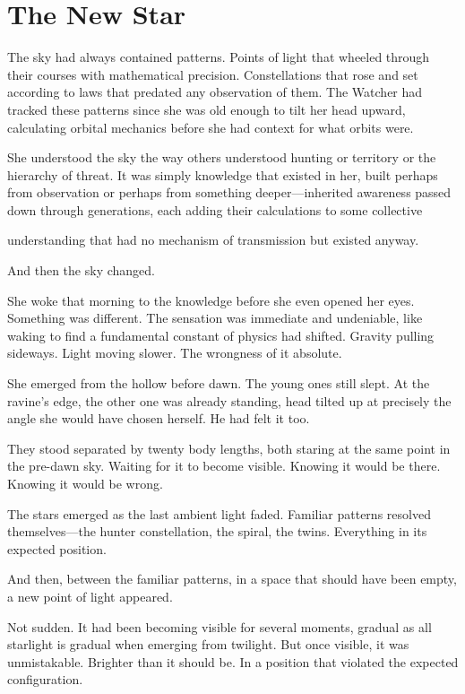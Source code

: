\chapter{The New Star}
\label{ch:04}


The sky had always contained patterns. Points of light that wheeled through their courses with mathematical precision. Constellations that rose and set according to laws that predated any observation of them. The Watcher had tracked these patterns since she was old enough to tilt her head upward, calculating orbital mechanics before she had context for what orbits were.

She understood the sky the way others understood hunting or territory or the hierarchy of threat. It was simply knowledge that existed in her, built perhaps from observation or perhaps from something deeper—inherited awareness passed down through generations, each adding their calculations to some collective

understanding that had no mechanism of transmission but existed anyway.

And then the sky changed.

She woke that morning to the knowledge before she even opened her eyes. Something was different. The sensation was immediate and undeniable, like waking to find a fundamental constant of physics had shifted. Gravity pulling sideways. Light moving slower. The wrongness of it absolute.

She emerged from the hollow before dawn. The young ones still slept. At the ravine's edge, the other one was already standing, head tilted up at precisely the angle she would have chosen herself. He had felt it too.

They stood separated by twenty body lengths, both staring at the same point in the pre-dawn sky. Waiting for it to become visible. Knowing it would be there. Knowing it would be wrong.

The stars emerged as the last ambient light faded. Familiar patterns resolved themselves—the hunter constellation, the spiral, the twins. Everything in its expected position.

And then, between the familiar patterns, in a space that should have been empty, a new point of light appeared.

Not sudden. It had been becoming visible for several moments, gradual as all starlight is gradual when emerging from twilight. But once visible, it was unmistakable. Brighter than it should be. In a position that violated the expected configuration.

